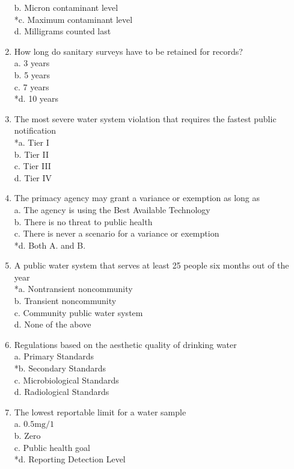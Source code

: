 \begin{enumerate}[1.]
b. Micron contaminant level\\
*c. Maximum contaminant level\\
d. Milligrams counted last\\
\item How long do sanitary surveys have to be retained for records?\\
a. 3 years\\
b. 5 years\\
c. 7 years\\
*d. 10 years\\
\item The most severe water system violation that requires the fastest public notification\\
*a. Tier I\\
b. Tier II\\
c. Tier III\\
d. Tier IV
\item The primacy agency may grant a variance or exemption as long as\\
a. The agency is using the Best Available Technology\\
b. There is no threat to public health\\
c. There is never a scenario for a variance or exemption\\
*d. Both A. and B.\\
\item A public water system that serves at least 25 people six months out of the year\\
*a. Nontransient noncommunity\\
b. Transient noncommunity\\
c. Community public water system\\
d. None of the above\\
\item Regulations based on the aesthetic quality of drinking water\\
a. Primary Standards\\
*b. Secondary Standards\\
c. Microbiological Standards\\
d. Radiological Standards\\
\item The lowest reportable limit for a water sample\\
a. $0.5 \mathrm{mg} / 1$\\
b. Zero\\
c. Public health goal\\
*d. Reporting Detection Level\\

\end{enumerate}
